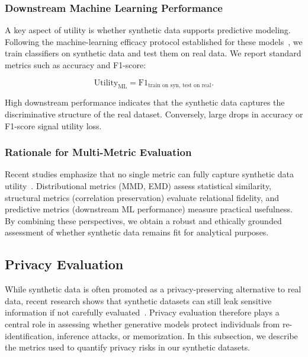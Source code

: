 \documentclass[11pt]{article}
\begin{document}
\subsubsection{Downstream Machine Learning Performance}

A key aspect of utility is whether synthetic data supports predictive modeling. Following the machine-learning efficacy protocol established for these models~\cite{xu2019modeling}, we train classifiers on synthetic data and test them on real data. We report standard metrics such as accuracy and F1-score:

\begin{equation}
\text{Utility}_{\text{ML}} = 
\text{F1}_{\text{train on syn, test on real}}.
\end{equation}

High downstream performance indicates that the synthetic data captures the discriminative structure of the real dataset. Conversely, large drops in accuracy or F1-score signal utility loss.

\subsubsection{Rationale for Multi-Metric Evaluation}

Recent studies emphasize that no single metric can fully capture synthetic data utility~\cite{little2025synthetic}. Distributional metrics (MMD, EMD) assess statistical similarity, structural metrics (correlation preservation) evaluate relational fidelity, and predictive metrics (downstream ML performance) measure practical usefulness. By combining these perspectives, we obtain a robust and ethically grounded assessment of whether synthetic data remains fit for analytical purposes.



\subsection{Privacy Evaluation}

While synthetic data is often promoted as a privacy-preserving alternative to real data, recent research shows that synthetic datasets can still leak sensitive information if not carefully evaluated~\cite{stadler2022synthetic}. Privacy evaluation therefore plays a central role in assessing whether generative models protect individuals from re-identification, inference attacks, or memorization. In this subsection, we describe the metrics used to quantify privacy risks in our synthetic datasets.
\end{document}
